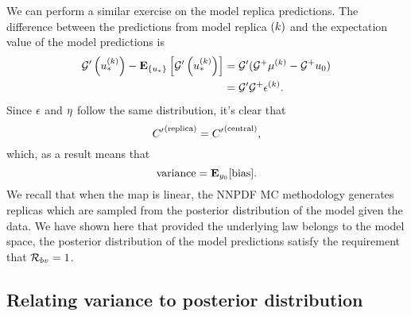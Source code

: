 We can perform a similar exercise on the model replica predictions. The difference
between the predictions from model replica $(k)$ and the expectation value
of the model predictions is
\begin{equation}
    \begin{split}
        {{\mathcal{G}}^{\prime}}\left(u_*^{(k)}\right) -
        \mathbf{E}_{\{ u_* \}} \left[ {{\mathcal{G}}^{\prime}}\left(u_*^{(k)}\right) \right] &=
        {{\mathcal{G}}^{\prime}} (\mathcal{G}^+ \mu^{(k)} - \mathcal{G}^+ u_0) \\
        &= {{\mathcal{G}}^{\prime}} \mathcal{G}^+ \epsilon^{(k)}.
    \end{split}
\end{equation}
Since $\epsilon$ and $\eta$ follow the same distribution, it's clear that
\begin{equation}
    {{C}^{\prime}}^{(\rm replica)} = {{C}^{\prime}}^{(\rm central)},
\end{equation}
which, as a result means that
\begin{equation}
    {\rm variance} = \mathbf{E}_{y_0}[{\rm bias}].
\end{equation}
We recall that when the map is linear, the NNPDF MC methodology generates replicas
which are sampled from the posterior distribution of the model given the data.
We have shown here that provided the underlying law belongs to the model
space, the posterior distribution of the model predictions satisfy the
requirement that $\mathcal{R}_{bv} = 1$.

\subsection{Relating variance to posterior distribution}

